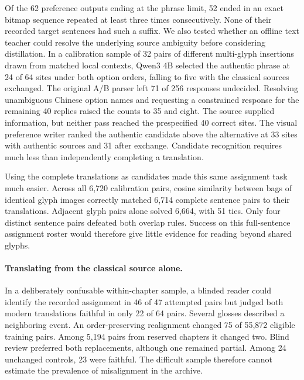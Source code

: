 \documentclass[12pt,a4paper]{article}
\providecommand{\DIFadd}[1]{{\protect\color{blue} \sf #1}} %
\begin{document}
\DIFadd{Of the 62 preference outputs ending at the phrase limit, 52 ended in an exact bitmap sequence repeated at least three times consecutively. None of their recorded target sentences had such a suffix. We also tested whether an offline text teacher could resolve the underlying source ambiguity before considering distillation. In a calibration sample of 32 pairs of different multi-glyph insertions drawn from matched local contexts, Qwen3 4B selected the authentic phrase at 24 of 64 sites under both option orders, falling to five with the classical sources exchanged. The original A/B parser left 71 of 256 responses undecided. Resolving unambiguous Chinese option names and requesting a constrained response for the remaining 40 replies raised the counts to 35 and eight. The source supplied information, but neither pass reached the prespecified 40 correct sites. The visual preference writer ranked the authentic candidate above the alternative at 33 sites with authentic sources and 31 after exchange. Candidate recognition requires much less than independently completing a translation.
}

\DIFadd{Using the complete translations as candidates made this same assignment task much easier. Across all 6,720 calibration pairs, cosine similarity between bags of identical glyph images correctly matched 6,714 complete sentence pairs to their translations. Adjacent glyph pairs alone solved 6,664, with 51 ties. Only four distinct sentence pairs defeated both overlap rules. Success on this full-sentence assignment roster would therefore give little evidence for reading beyond shared glyphs.
}

\paragraph{\DIFadd{Translating from the classical source alone.}}
\DIFadd{In a deliberately confusable within-chapter sample, a blinded reader could identify the recorded assignment in 46 of 47 attempted pairs but judged both modern translations faithful in only 22 of 64 pairs. Several glosses described a neighboring event. An order-preserving realignment changed 75 of 55,872 eligible training pairs. Among 5,194 pairs from reserved chapters it changed two. Blind review preferred both replacements, although one remained partial. Among 24 unchanged controls, 23 were faithful. The difficult sample therefore cannot estimate the prevalence of misalignment in the archive.
}
\end{document}
